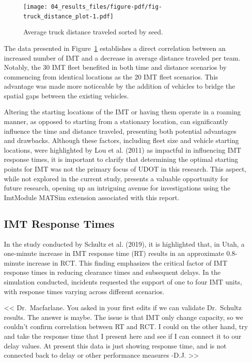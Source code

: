 \documentclass[fancy, oneside, mastersfancy, ms]{byuthesis}
\begin{document}
\begin{figure}

{\centering \texttt{[image: 04\_results\_files/figure-pdf/fig-truck\_distance\_plot-1.pdf]}

}

\caption{\label{fig-truck_distance_plot}Average truck distance traveled
sorted by seed.}

\end{figure}

The data presented in Figure~\ref{fig-truck_distance_plot} establishes a
direct correlation between an increased number of IMT and a decrease in
average distance traveled per team. Notably, the 30 IMT fleet benefited
in both time and distance scenarios by commencing from identical
locations as the 20 IMT fleet scenarios. This advantage was made more
noticeable by the addition of vehicles to bridge the spatial gaps
between the existing vehicles.

Altering the starting locations of the IMT or having them operate in a
roaming manner, as opposed to starting from a stationary location, can
significantly influence the time and distance traveled, presenting both
potential advantages and drawbacks. Although these factors, including
fleet size and vehicle starting locations, were highlighted by Lou et
al. (2011) as impactful in influencing IMT response times, it is
important to clarify that determining the optimal starting points for
IMT was not the primary focus of UDOT in this research. This aspect,
while not explored in the current study, presents a valuable opportunity
for future research, opening up an intriguing avenue for investigations
using the ImtModule MATSim extension associated with this report.

\hypertarget{imt-response-times}{%
\subsection{IMT Response Times}\label{imt-response-times}}

In the study conducted by Schultz et al. (2019), it is highlighted that,
in Utah, a one-minute increase in IMT response time (RT) results in an
approximate 0.8-minute increase in RCT. This finding emphasizes the
critical factor of IMT response times in reducing clearance times and
subsequent delays. In the simulation conducted, incidents requested the
support of one to four IMT units, with response times varying across
different scenarios.

\textless\textless{} Dr.~Macfarlane. You asked in your first edits if we
can validate Dr.~Schultz results. The answer is maybe. The issue is that
IMT only change capacity, so we couldn't confirm correlation between RT
and RCT. I could on the other hand, try and take the response time that
I present here and see if I can connect it to our delay values. At
present this data is just showing response time, and is not connected
back to delay or other performance measures -D.J.
\textgreater\textgreater{}
\end{document}
